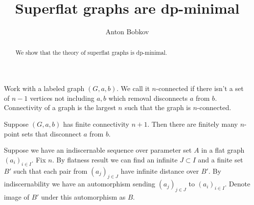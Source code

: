 \documentclass{amsart}
\begin{document}
\title{Superflat graphs are dp-minimal}
\author{Anton Bobkov}

\begin{abstract}
	We show that the theory of superflat graphs is dp-minimal.
\end{abstract}

\maketitle

Work with a labeled graph $(G, a, b)$. We call it $n$-connected if there isn't a set of $n-1$ vertices not including $a,b$ which removal disconnects $a$ from $b$. Connectivity of a graph is the largest $n$ such that the graph is $n$-connected.

\begin{Lemma}
	Suppose $(G, a, b)$ has finite connectivity $n+1$. Then there are finitely many $n$-point sets that disconnect $a$ from $b$.
\end{Lemma}

Suppose we have an indiscernable sequence over parameter set $A$ in a flat graph $(a_i)_{i \in I}$. Fix $n$. By flatness result we can find an infinite $J \subset I$ and a finite set $B'$ such that each pair from $(a_j)_{j \in J}$ have infinite distance over $B'$. By indiscernability we have an automorphism sending $(a_j)_{j \in J}$ to $(a_i)_{i \in I}$. Denote image of $B'$ under this automorphism as $B$.
\end{document}
